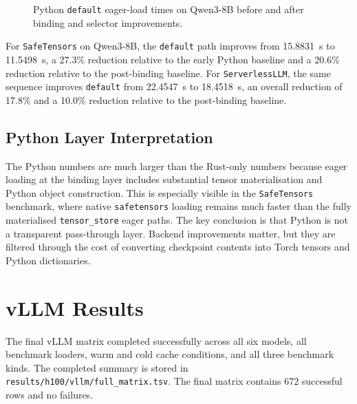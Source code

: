 \begin{figure}[h]
\centering
{}
\caption{Python \texttt{default} eager-load times on Qwen3-8B before and after binding and selector improvements.}
\label{fig:python-default-improvement}
\end{figure}

For \texttt{SafeTensors} on Qwen3-8B, the \texttt{default} path improves from 15.8831~s to 11.5498~s, a 27.3\% reduction relative to the early Python baseline and a 20.6\% reduction relative to the post-binding baseline. For \texttt{ServerlessLLM}, the same sequence improves \texttt{default} from 22.4547~s to 18.4518~s, an overall reduction of 17.8\% and a 10.0\% reduction relative to the post-binding baseline.

\subsection{Python Layer Interpretation}

The Python numbers are much larger than the Rust-only numbers because eager loading at the binding layer includes substantial tensor materialisation and Python object construction. This is especially visible in the \texttt{SafeTensors} benchmark, where native \texttt{safetensors} loading remains much faster than the fully materialised \texttt{tensor\_store} eager paths. The key conclusion is that Python is not a transparent pass-through layer. Backend improvements matter, but they are filtered through the cost of converting checkpoint contents into Torch tensors and Python dictionaries.

\section{vLLM Results}

The final vLLM matrix completed successfully across all six models, all benchmark loaders, warm and cold cache conditions, and all three benchmark kinds. The completed summary is stored in \texttt{results/h100/vllm/full\_matrix.tsv}. The final matrix contains 672 successful rows and no failures.

